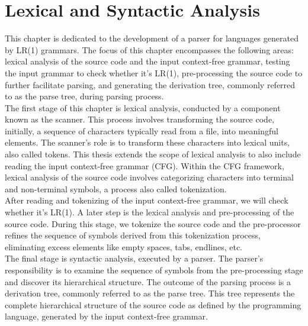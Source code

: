 \chapter{Lexical and Syntactic Analysis}\label{ch:Lexical and Syntactic Analysis}

This chapter is dedicated to the development of a parser for languages generated by LR(1) grammars. The focus of this chapter encompasses the following areas: lexical analysis of the source code and the input context-free grammar, testing the input grammar to check whether it's LR(1), pre-processing the source code to further facilitate parsing, and generating the derivation tree, commonly referred to as the parse tree, during parsing process.\\

The first stage of this chapter is lexical analysis, conducted by a component known as the scanner. This process involves transforming the source code, initially, a sequence of characters typically read from a file, into meaningful elements. The scanner's role is to transform these characters into lexical units, also called tokens. This thesis extends the scope of lexical analysis to also include reading the input context-free grammar (CFG). Within the CFG framework, lexical analysis of the source code involves categorizing characters into terminal and non-terminal symbols, a process also called tokenization.\\

After reading and tokenizing of the input context-free grammar, we will check whether it's LR(1). A later step is the lexical analysis and pre-processing of the source code. During this stage, we tokenize the source code and the pre-processor refines the sequence of symbols derived from this tokenization process, eliminating excess elements like empty spaces, tabs, endlines, etc.\\

The final stage is syntactic analysis, executed by a parser. The parser's responsibility is to examine the sequence of symbols from the pre-processing stage and discover its hierarchical structure. The outcome of the parsing process is a derivation tree, commonly referred to as the parse tree. This tree represents the complete hierarchical structure of the source code as defined by the programming language, generated by the input context-free grammar.\\

